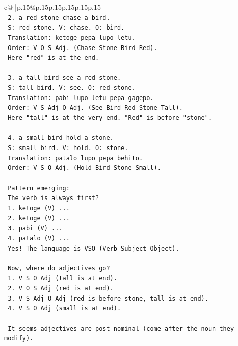 \documentclass{article}
\begin{document}
{\begin{supertabular}{c@{$\;$}|p{.15\linewidth}@{}p{.15\linewidth}p{.15\linewidth}p{.15\linewidth}p{.15\linewidth}p{.15\linewidth}}
{{{\\ 
\texttt{   2. a red stone chase a bird.} \\
\texttt{      S: red stone. V: chase. O: bird.} \\
\texttt{      Translation: ketoge pepa lupo letu.} \\
\texttt{      Order: V O S Adj. (Chase Stone Bird Red).} \\
\texttt{      Here "red" is at the end.} \\
\\ 
\texttt{   3. a tall bird see a red stone.} \\
\texttt{      S: tall bird. V: see. O: red stone.} \\
\texttt{      Translation: pabi lupo letu pepa gagepo.} \\
\texttt{      Order: V S Adj O Adj. (See Bird Red Stone Tall).} \\
\texttt{      Here "tall" is at the very end. "Red" is before "stone".} \\
\\ 
\texttt{   4. a small bird hold a stone.} \\
\texttt{      S: small bird. V: hold. O: stone.} \\
\texttt{      Translation: patalo lupo pepa behito.} \\
\texttt{      Order: V S O Adj. (Hold Bird Stone Small).} \\
\\ 
\texttt{   Pattern emerging:} \\
\texttt{   The verb is always first?} \\
\texttt{   1. ketoge (V) ...} \\
\texttt{   2. ketoge (V) ...} \\
\texttt{   3. pabi (V) ...} \\
\texttt{   4. patalo (V) ...} \\
\texttt{   Yes! The language is VSO (Verb{-}Subject{-}Object).} \\
\\ 
\texttt{   Now, where do adjectives go?} \\
\texttt{   1. V S O Adj (tall is at end).} \\
\texttt{   2. V O S Adj (red is at end).} \\
\texttt{   3. V S Adj O Adj (red is before stone, tall is at end).} \\
\texttt{   4. V S O Adj (small is at end).} \\
\\ 
\texttt{   It seems adjectives are post{-}nominal (come after the noun they modify).} \\
}}}
\end{supertabular}}
\end{document}
